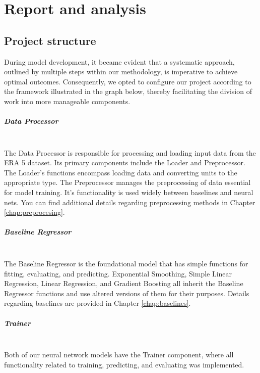 \chapter{Report and analysis}\label{chap:report}
\section{Project structure}

During model development, it became evident that a systematic approach, outlined by multiple steps within our methodology, is imperative to achieve optimal outcomes. Consequently, we opted to configure our project according to the framework illustrated in the graph below, thereby facilitating the division of work into more manageable components.\\



\paragraph{Data Processor}  \mbox{} \\
\noindent The Data Processor is responsible for processing and loading input data from the ERA 5 dataset. Its primary components include the Loader and Preprocessor. The Loader's functions encompass loading data and converting units to the appropriate type. The Preprocessor manages the preprocessing of data essential for model training. It's functionality is used widely between baselines and neural nets. You can find additional details regarding preprocessing methods in Chapter \ref{chap:preprocesing}.

\paragraph{Baseline Regressor}\mbox{} \\ 
\noindent The Baseline Regressor is the foundational model that has simple functions for fitting, evaluating, and predicting. Exponential Smoothing, Simple Linear Regression, Linear Regression, and Gradient Boosting all inherit the Baseline Regressor functions and use altered versions of them for their purposes. Details regarding baselines are provided in Chapter \ref{chap:baselines}.

\paragraph{Trainer} \mbox{} \\
\noindent Both of our neural network models have the Trainer component, where all functionality related to training, predicting, and evaluating was implemented.

